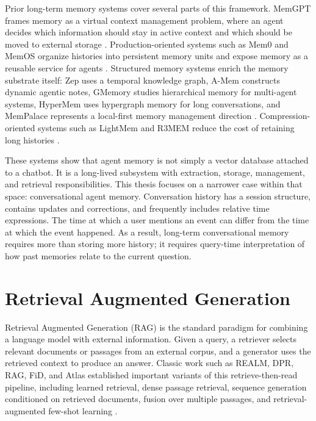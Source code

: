 Prior long-term memory systems cover several parts of this framework. MemGPT
frames memory as a virtual context management problem, where an agent decides
which information should stay in active context and which should be moved to
external storage \cite{packer2023memgpt}. Production-oriented systems such as
Mem0 and MemOS organize histories into persistent memory units and expose
memory as a reusable service for agents \cite{chhikara2025mem0,li2025memos}.
Structured memory systems enrich the memory substrate itself: Zep uses a
temporal knowledge graph, A-Mem constructs dynamic agentic notes, GMemory
studies hierarchical memory for multi-agent systems, HyperMem uses hypergraph
memory for long conversations, and MemPalace represents a local-first memory
management direction \cite{rasmussen2025zep,xu2025amem,zhang2025gmemory,
yue2026hypermem,mempalace2026}. Compression-oriented systems such as LightMem
and R3MEM reduce the cost of retaining long histories
\cite{fang2025lightmem,wang2025r3mem}.

These systems show that agent memory is not simply a vector database attached
to a chatbot. It is a long-lived subsystem with extraction, storage,
management, and retrieval responsibilities. This thesis focuses on a narrower
case within that space: conversational agent memory. Conversation history has a
session structure, contains updates and corrections, and frequently includes
relative time expressions. The time at which a user mentions an event can
differ from the time at which the event happened. As a result, long-term
conversational memory requires more than storing more history; it requires
query-time interpretation of how past memories relate to the current question.

\section{Retrieval Augmented Generation}
\label{sec:rw-rag}

Retrieval Augmented Generation (RAG) is the standard paradigm for combining a
language model with external information. Given a query, a retriever selects
relevant documents or passages from an external corpus, and a generator uses
the retrieved context to produce an answer. Classic work such as REALM, DPR,
RAG, FiD, and Atlas established important variants of this retrieve-then-read
pipeline, including learned retrieval, dense passage retrieval, sequence
generation conditioned on retrieved documents, fusion over multiple passages,
and retrieval-augmented few-shot learning \cite{guu2020realm,
karpukhin2020dpr,lewis2020rag,izacard2021fid,izacard2023atlas}.

